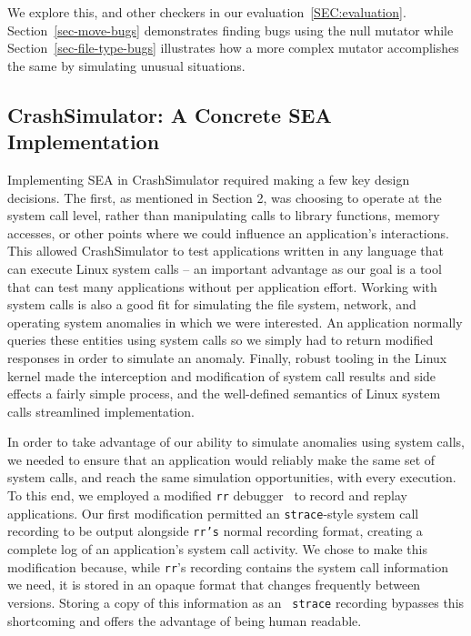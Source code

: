 We explore this, and other checkers in our evaluation~\ref{SEC:evaluation}.
Section~\ref{sec-move-bugs} demonstrates finding bugs using the null
mutator while Section~\ref{sec-file-type-bugs}
illustrates how a more complex
mutator accomplishes the same by simulating unusual situations.


\subsection{CrashSimulator: A Concrete SEA Implementation}
\label{SUBSEC:ApproachCrashSim}

Implementing SEA in CrashSimulator
required making a few key design decisions. The first, as mentioned in
Section 2, was choosing to operate at the system call level, rather than
manipulating calls to library functions, memory accesses, or other points
where we could influence an application’s interactions.
This allowed CrashSimulator
to test applications written in any
language that can execute Linux system
calls -- an important advantage as our
goal is a tool that can test many
applications without per application
effort.
Working with system calls is also a good fit
for simulating the file system,
network, and operating system anomalies in which we were interested.
An application normally queries these entities using system calls
so we simply had to return modified responses in order to simulate an
anomaly.
Finally, robust tooling in the Linux kernel made the
interception and modification of system call results and side effects a
fairly simple process,  and the well-defined semantics of Linux
system calls streamlined implementation.


In order to take advantage of our ability to simulate anomalies using
system calls, we needed to ensure that an application would reliably make
the same set of
system calls, and reach the same simulation opportunities,
with every execution.
To this end,
we employed a modified
{\tt rr} debugger~\cite{rrwebsite} to record and replay applications. Our
first modification permitted an {\tt strace}-style system call recording
to be output alongside {\tt rr's} normal recording format,
creating a complete log of an application’s system call activity.
We chose to make this
modification because, while {\tt rr}'s recording contains the system call
information we need, it is stored in an opaque format that changes
frequently between versions.  Storing a copy of this information as an {\tt
strace} recording bypasses this shortcoming and offers the advantage of
being human readable.

